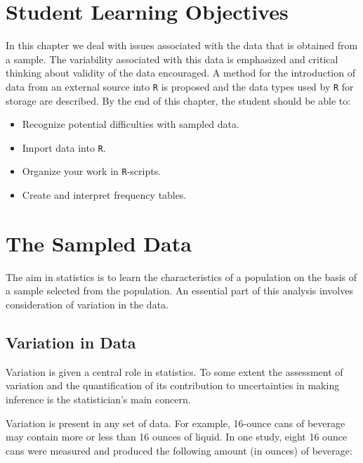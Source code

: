 \documentclass[
]{krantz}
\providecommand{\tightlist}{%
  \setlength{\itemsep}{0pt}\setlength{\parskip}{0pt}}
\theoremstyle{definition}
\theoremstyle{definition}
\theoremstyle{definition}
\theoremstyle{remark}
\begin{document}
\hypertarget{student-learning-objectives-1}{%
\section{Student Learning Objectives}\label{student-learning-objectives-1}}

In this chapter we deal with issues associated with the data that is obtained from a sample. The variability associated with this data is emphasized and critical thinking about validity of the data encouraged. A method for the introduction of data from an external source into \texttt{R} is proposed and the data types used by \texttt{R} for storage are described. By the end of this chapter, the student should be able to:

\begin{itemize}
\tightlist
\item
  Recognize potential difficulties with sampled data.
\item
  Import data into \texttt{R}.
\item
  Organize your work in \texttt{R}-scripts.
\item
  Create and interpret frequency tables.
\end{itemize}

\hypertarget{the-sampled-data}{%
\section{The Sampled Data}\label{the-sampled-data}}

The aim in statistics is to learn the characteristics of a population on the basis of a sample selected from the population. An essential part of this analysis involves consideration of variation in the data.

\hypertarget{variation-in-data}{%
\subsection{Variation in Data}\label{variation-in-data}}

Variation is given a central role in statistics. To some extent the assessment of variation and the quantification of its contribution to uncertainties in making inference is the statistician's main concern.

Variation is present in any set of data. For example, 16-ounce cans of beverage may contain more or less than 16 ounces of liquid. In one study, eight 16 ounce cans were measured and produced the following amount (in ounces) of beverage:
\end{document}
